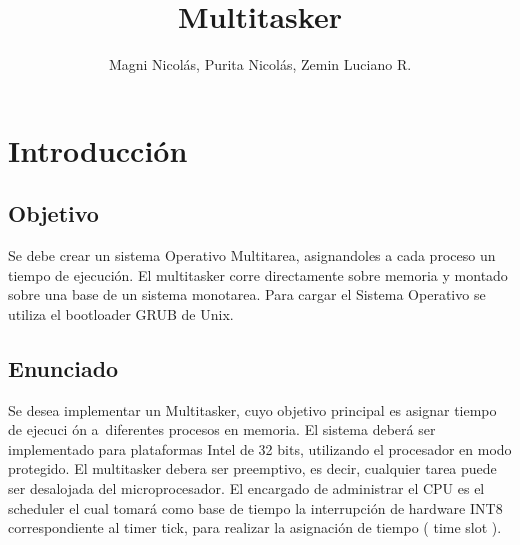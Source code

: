 \documentclass[10pt,a4paper]{article}
\author{Magni Nicol\'as, Purita Nicol\'as, Zemin Luciano R.  }
\title{Multitasker}
\begin{document}
\maketitle
\newpage
\tableofcontents
\clearpage

\section{Introducci\'on}
	\subsection{Objetivo}
		Se debe crear un sistema Operativo Multitarea, asignandoles a cada proceso un tiempo de ejecuci\'on. El multitasker corre directamente sobre memoria y montado sobre una base de un sistema monotarea. Para cargar el Sistema Operativo se utiliza el bootloader GRUB de Unix.
	\subsection{Enunciado}
Se desea implementar un Multitasker, cuyo objetivo  principal es asignar tiempo de ejecuci \'on a\ diferentes procesos en memoria. El sistema deber\'a ser implementado para plataformas Intel de 32 bits, utilizando el procesador en modo protegido. El multitasker debera ser preemptivo, es decir, cualquier tarea puede ser desalojada del microprocesador. El encargado de administrar el CPU es el scheduler el cual tomar\'a como base de tiempo la interrupci\'on de hardware INT8 correspondiente al timer tick, para realizar la asignaci\'on de tiempo ( time slot ).
\end{document}
